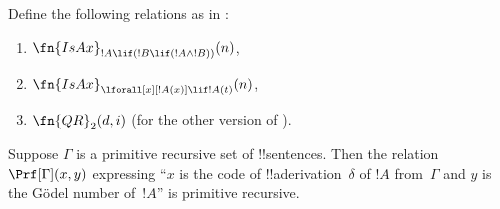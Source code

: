 \documentclass[../../../include/open-logic-section]{subfiles}
\begin{document}
\begin{prob}
Define the following relations as in
:
\begin{enumerate}
\item $\fn{IsAx}_{!A \lif (!B \lif (!A \land !B))}(n)$,
\item $\fn{IsAx}_{\lforall[x][!A(x)] \lif !A(t)}(n)$,
\item $\fn{QR}_{2}(d, i)$ (for the other version of \QR).
\end{enumerate}
\end{prob}

\begin{prop}
Suppose $\Gamma$ is a primitive recursive set of !!{sentence}s.  Then
the relation $\Prf[\Gamma](x, y)$ expressing ``$x$ is the code of
!!a{derivation}~$\delta$ of $!A$ from~$\Gamma$ and $y$ is the G\"odel
number of~$!A$'' is primitive recursive.
\end{prop}
\end{document}
